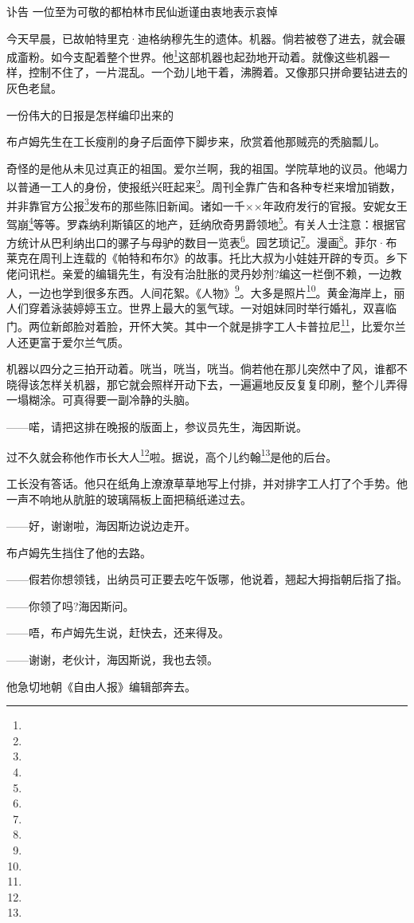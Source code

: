\par 讣告 一位至为可敬的都柏林市民仙逝谨由衷地表示哀悼
\par 今天早晨，已故帕特里克·迪格纳穆先生的遗体。机器。倘若被卷了进去，就会碾成齑粉。如今支配着整个世界。他\footnote{}这部机器也起劲地开动着。就像这些机器一样，控制不住了，一片混乱。一个劲儿地干着，沸腾着。又像那只拼命要钻进去的灰色老鼠。
\par 一份伟大的日报是怎样编印出来的
\par 布卢姆先生在工长瘦削的身子后面停下脚步来，欣赏着他那贼亮的秃脑瓢儿。
\par 奇怪的是他从未见过真正的祖国。爱尔兰啊，我的祖国。学院草地的议员。他竭力以普通一工人的身份，使报纸兴旺起来\footnote{}。周刊全靠广告和各种专栏来增加销数，并非靠官方公报\footnote{}发布的那些陈旧新闻。诸如一千××年政府发行的官报。安妮女王驾崩\footnote{}等等。罗森纳利斯镇区的地产，廷纳欣奇男爵领地\footnote{}。有关人士注意：根据官方统计从巴利纳出口的骡子与母驴的数目一览表\footnote{}。园艺琐记\footnote{}。漫画\footnote{}。菲尔·布莱克在周刊上连载的《帕特和布尔》的故事。托比大叔为小娃娃开辟的专页。乡下佬问讯栏。亲爱的编辑先生，有没有治肚胀的灵丹妙剂?编这一栏倒不赖，一边教人，一边也学到很多东西。人间花絮。《人物》\footnote{}。大多是照片\footnote{}。黄金海岸上，丽人们穿着泳装婷婷玉立。世界上最大的氢气球。一对姐妹同时举行婚礼，双喜临门。两位新郎脸对着脸，开怀大笑。其中一个就是排字工人卡普拉尼\footnote{}，比爱尔兰人还更富于爱尔兰气质。
\par 机器以四分之三拍开动着。咣当，咣当，咣当。倘若他在那儿突然中了风，谁都不晓得该怎样关机器，那它就会照样开动下去，一遍遍地反反复复印刷，整个儿弄得一塌糊涂。可真得要一副冷静的头脑。
\par ——喏，请把这排在晚报的版面上，参议员先生，海因斯说。
\par 过不久就会称他作市长大人\footnote{}啦。据说，高个儿约翰\footnote{}是他的后台。
\par 工长没有答话。他只在纸角上潦潦草草地写上付排，并对排字工人打了个手势。他一声不响地从肮脏的玻璃隔板上面把稿纸递过去。
\par ——好，谢谢啦，海因斯边说边走开。
\par 布卢姆先生挡住了他的去路。
\par ——假若你想领钱，出纳员可正要去吃午饭哪，他说着，翘起大拇指朝后指了指。
\par ——你领了吗?海因斯问。
\par ——唔，布卢姆先生说，赶快去，还来得及。
\par ——谢谢，老伙计，海因斯说，我也去领。
\par 他急切地朝《自由人报》编辑部奔去。
